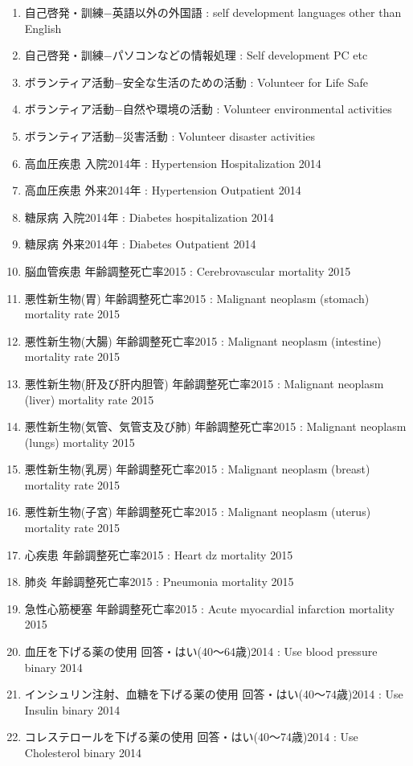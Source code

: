 \begin{multicols}{2}
\begin{enumerate}
  \item 自己啓発・訓練−英語以外の外国語  :  self development languages other than English
  \item 自己啓発・訓練−パソコンなどの情報処理  :  Self development PC etc
  \item ボランティア活動−安全な生活のための活動  :  Volunteer for Life Safe
  \item ボランティア活動−自然や環境の活動  :  Volunteer environmental activities
  \item ボランティア活動−災害活動  :  Volunteer disaster activities
  \item 高血圧疾患 入院2014年  :  Hypertension Hospitalization 2014
  \item 高血圧疾患 外来2014年  :  Hypertension Outpatient 2014
  \item 糖尿病 入院2014年  :  Diabetes hospitalization 2014
  \item 糖尿病 外来2014年  :  Diabetes Outpatient 2014
  \item 脳血管疾患 年齢調整死亡率2015  :  Cerebrovascular mortality 2015
  \item 悪性新生物(胃) 年齢調整死亡率2015  :  Malignant neoplasm (stomach) mortality rate 2015
  \item 悪性新生物(大腸) 年齢調整死亡率2015  :  Malignant neoplasm (intestine) mortality rate 2015
  \item 悪性新生物(肝及び肝内胆管) 年齢調整死亡率2015  :  Malignant neoplasm (liver) mortality rate 2015
  \item 悪性新生物(気管、気管支及び肺) 年齢調整死亡率2015  :  Malignant neoplasm (lungs) mortality 2015
  \item 悪性新生物(乳房) 年齢調整死亡率2015  :  Malignant neoplasm (breast) mortality rate 2015
  \item 悪性新生物(子宮) 年齢調整死亡率2015  :  Malignant neoplasm (uterus) mortality rate 2015
  \item 心疾患 年齢調整死亡率2015  :  Heart dz mortality 2015
  \item 肺炎 年齢調整死亡率2015  :  Pneumonia mortality 2015
  \item 急性心筋梗塞 年齢調整死亡率2015  :  Acute myocardial infarction mortality 2015
  \item 血圧を下げる薬の使用 回答・はい(40〜64歳)2014  :  Use blood pressure binary 2014
  \item インシュリン注射、血糖を下げる薬の使用 回答・はい(40〜74歳)2014  :  Use Insulin binary 2014
  \item コレステロールを下げる薬の使用 回答・はい(40〜74歳)2014  :  Use Cholesterol binary 2014

\end{enumerate}
\end{multicols}
